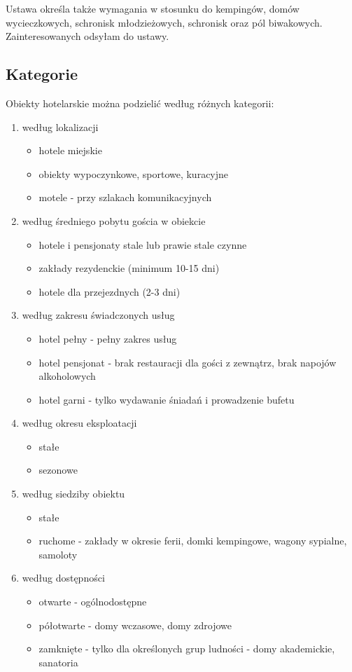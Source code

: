 \documentclass[a4paper,onecolumn,oneside,11pt,wide,floatssmall]{mwrep}
\theoremstyle{definition}
\theoremstyle{plain}%
\theoremstyle{remark}
\begin{document}
Ustawa określa także wymagania w stosunku do kempingów, domów wycieczkowych, 
schronisk młodzieżowych, schronisk oraz pól biwakowych. Zainteresowanych 
odsyłam do ustawy.

\subsection{Kategorie} 
Obiekty hotelarskie można podzielić według różnych kategorii\cite[15-16]{
KlasKatZakHot}:

\begin{enumerate}
  \item według lokalizacji
    \begin{itemize}
      \item hotele miejskie
      \item obiekty wypoczynkowe, sportowe, kuracyjne
      \item motele - przy szlakach komunikacyjnych
    \end{itemize}
  \item według średniego pobytu gościa w obiekcie
    \begin{itemize}
      \item hotele i pensjonaty stale lub prawie stale czynne
      \item zakłady rezydenckie (minimum 10-15 dni)
      \item hotele dla przejezdnych (2-3 dni)
    \end{itemize}
  \item według zakresu świadczonych usług
    \begin{itemize}
      \item hotel pełny - pełny zakres usług
      \item hotel pensjonat - brak restauracji dla gości z zewnątrz, brak 
      napojów alkoholowych
      \item hotel garni - tylko wydawanie śniadań i prowadzenie bufetu
    \end{itemize}
  \item według okresu eksploatacji
    \begin{itemize}
      \item stałe
      \item sezonowe
    \end{itemize}
  \item według siedziby obiektu
    \begin{itemize}
      \item stałe
      \item ruchome - zakłady w okresie ferii, domki kempingowe, wagony 
      sypialne, samoloty
    \end{itemize}
  \item według dostępności
    \begin{itemize}
      \item otwarte - ogólnodostępne
      \item półotwarte - domy wczasowe, domy zdrojowe
      \item zamknięte - tylko dla określonych grup ludności - domy 
      akademickie, sanatoria
    \end{itemize}
\end{enumerate}
\end{document}
